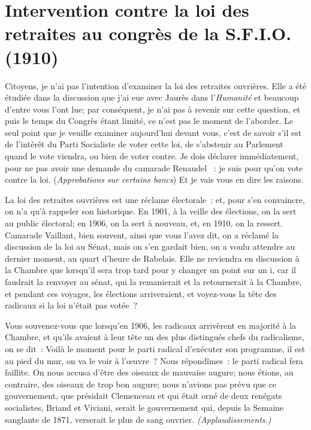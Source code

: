 \documentclass[french,twoside]{book} %
\begin{document}
  \chapter[{Intervention contre la loi des retraites au congrès de la S.F.I.O. (1910)}]{Intervention contre la loi des retraites au congrès de la S.F.I.O. (1910)}
\noindent Citoyens, je n’ai pas l’intention d’examiner la loi des retraites ouvrières. Elle a été étudiée dans la discussion que j’ai eue avec Jaurès dans l’\emph{Humanité} et beaucoup d’entre vous l’ont lue; par conséquent, je n’ai pas à revenir sur cette question, et puis le temps du Congrès étant limité, ce n’est pas le moment de l’aborder. Le seul point que je veuille examiner aujourd’hui devant vous, c’est de savoir s’il est de l’intérêt du Parti Socialiste de voter cette loi, de s’abstenir au Parlement quand le vote viendra, ou bien de voter contre. Je dois déclarer immédiatement, pour ne pas avoir une demande du camarade Renaudel  : je suis pour qu’on vote contre la loi. (\emph{Approbations sur certains bancs}) Et je vais vous en dire les raisons.\par
La loi des retraites ouvrières est une réclame électorale : et, pour s’en convaincre, on n’a qu’à rappeler son historique. En 1901, à la veille des élections, on la sert au public électoral; en 1906, on la sert à nouveau, et, en 1910, on la ressert. Camarade Vaillant, bien souvent, ainsi que vous l’avez dit, on a réclamé la discussion de la loi au Sénat, mais on s’en gardait bien, on a voulu attendre au dernier moment, au quart d’heure de Rabelais. Elle ne reviendra en discussion à la Chambre que lorsqu’il sera trop tard pour y changer un point sur un i, car il faudrait la renvoyer au sénat, qui la remanierait et la retournerait à la Chambre, et pendant ces voyages, les élections arriveraient, et voyez-vous la tête des radicaux si la loi n’était pas votée ?\par
Vous souvenez-vous que lorsqu’en 1906, les radicaux arrivèrent en majorité à la Chambre, et qu’ils avaient à leur tête un des plus distingués chefs du radicalisme, on se dit : Voilà le moment pour le parti radical d’exécuter son programme, il est au pied du mur, on va le voir à l’œuvre ? Nous répondîmes : le parti radical fera faillite. On nous accusa d’être des oiseaux de mauvaise augure; nous étions, au contraire, des oiseaux de trop bon augure; nous n’avions pas prévu que ce gouvernement, que présidait Clemenceau et qui était orné de deux renégats socialistes, Briand et Viviani, serait le gouvernement qui, depuis la Semaine sanglante de 1871, verserait le plus de sang ouvrier. \emph{(Applaudissements.)}\par
\end{document}
